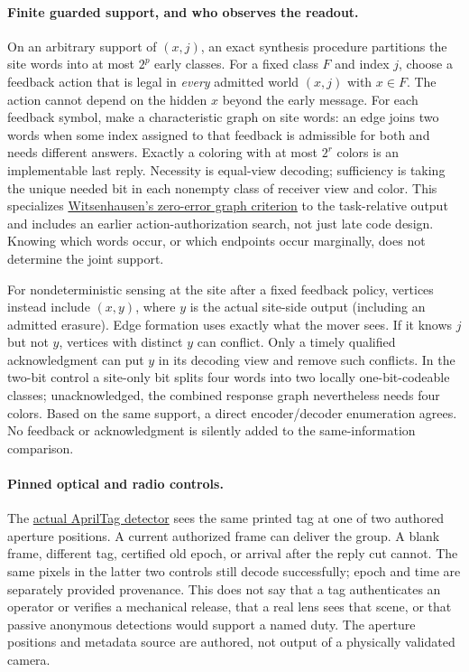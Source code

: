 \documentclass[11pt]{article}
\begin{document}
\paragraph{Finite guarded support, and who observes the readout.}
On an arbitrary support of $(x,j)$, an exact synthesis
procedure partitions the site words into at most $2^p$
early classes. For a fixed class $F$ and index $j$, choose
a feedback action that is legal in \emph{every} admitted
world $(x,j)$ with $x\in F$. The action cannot depend
on the hidden $x$ beyond the early message. For each
feedback symbol, make a characteristic graph on site
words: an edge joins two words when some index assigned
to that feedback is admissible for both and needs different
answers. Exactly a coloring with at most $2^r$ colors is
an implementable last reply. Necessity is equal-view decoding;
sufficiency is taking the unique needed bit in each nonempty
class of receiver view and color. This specializes
\href{https://ieeexplore.ieee.org/document/1055607/}{Witsenhausen's
zero-error graph criterion} to the task-relative output and
includes an earlier action-authorization search, not just
late code design. Knowing which words occur, or which
endpoints occur marginally, does not determine the joint support.

For nondeterministic sensing at the site after a fixed feedback
policy, vertices instead include $(x,y)$, where $y$ is the
actual site-side output (including an admitted erasure).
Edge formation uses exactly what the mover sees. If it knows
$j$ but not $y$, vertices with distinct $y$ can conflict.
Only a timely qualified acknowledgment can put $y$ in its
decoding view and remove such conflicts. In the two-bit
control a site-only bit splits four words into two locally
one-bit-codeable classes; unacknowledged, the combined
response graph nevertheless needs four colors. Based on
the same support, a direct encoder/decoder enumeration agrees.
No feedback or acknowledgment is silently added to the
same-information comparison.

\paragraph{Pinned optical and radio controls.}
The \href{https://github.com/AprilRobotics/apriltag/tree/94be783968e5091bcc9972c72c84fd63efce2935}{actual
AprilTag detector} sees the same printed tag at one of two
authored aperture positions. A current authorized frame
can deliver the group. A blank frame, different tag, certified
old epoch, or arrival after the reply cut cannot. The same
pixels in the latter two controls still decode successfully;
epoch and time are separately provided provenance.
This does not say that a tag authenticates an operator or
verifies a mechanical release, that a real lens sees that
scene, or that passive anonymous detections would support
a named duty. The aperture positions and metadata source
are authored, not output of a physically validated camera.
\end{document}
